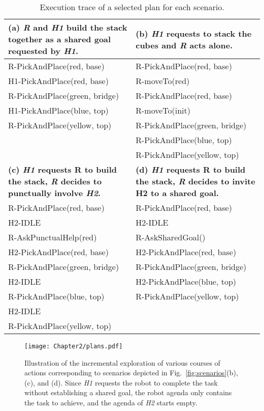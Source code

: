 \begin{table}[h]
\small
\begin{tabularx}{0.98\textwidth}{|X||X|}
    \hline
    \textbf{(a) \textit{R} and \textit{H1} build the stack together as a shared goal requested by \textit{H1}.}     & \textbf{(b) \textit{H1} requests to stack the cubes and \textit{R} acts alone.} \\
    \hline
    R-PickAndPlace(red, base)     & R-PickAndPlace(red, base) \\ 
    H1-PickAndPlace(red, base)     & R-moveTo(red) \\  
    R-PickAndPlace(green, bridge) & R-PickAndPlace(red, base) \\
    H1-PickAndPlace(blue, top)     & R-moveTo(init) \\
    R-PickAndPlace(yellow, top)   & R-PickAndPlace(green, bridge) \\
                                    & R-PickAndPlace(blue, top) \\
                                    & R-PickAndPlace(yellow, top) \\
    \hline \hline
    \textbf{(c) \textit{H1} requests R to build the stack, \textit{R} decides to punctually involve \textit{H2}.} & \textbf{(d) \textit{H1} requests R to build the stack, \textit{R} decides to invite H2 to a shared goal.} \\
    \hline
    R-PickAndPlace(red, base)     & R-PickAndPlace(red, base) \\
    H2-IDLE                        & H2-IDLE \\
    R-AskPunctualHelp(red)        & R-AskSharedGoal() \\
    H2-PickAndPlace(red, base)     & H2-PickAndPlace(red, base) \\
    R-PickAndPlace(green, bridge) & R-PickAndPlace(green, bridge) \\
    H2-IDLE                        & H2-PickAndPlace(blue, top) \\
    R-PickAndPlace(blue, top)     & R-PickAndPlace(yellow, top) \\
    H2-IDLE                        & \\
    R-PickAndPlace(yellow, top)   & \\
    \hline
\end{tabularx}
\caption{Execution trace of a selected plan for each scenario.}
\label{tab:plans}
\end{table}

\begin{sidewaysfigure}
    \centering 
    \texttt{[image: Chapter2/plans.pdf]}
    \caption{Illustration of the incremental exploration of various courses of actions corresponding to scenarios depicted in Fig.~\ref{fig:scenarios}(b), (c), and (d). Since \textit{H1} requests the robot to complete the task without establishing a shared goal, the robot agenda only contains the task to achieve, and the agenda of \textit{H2} starts empty.}
    \label{fig:plans}
\end{sidewaysfigure}


